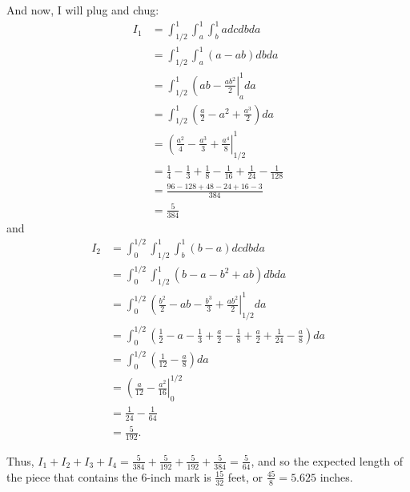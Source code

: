 \documentclass[11pt]{article}
\theoremstyle{definition}
\begin{document}
And now, I will plug and chug:
\begin{align*}
I_1 & = \int_{1/2}^1 \int_a^1 \int_b^1 adcdbda \\
& = \int_{1/2}^1 \int_a^1 (a-ab)dbda \\
& = \int_{1/2}^1 \left(ab - \frac{ab^2}{2}\right|_a^1 da \\
& = \int_{1/2}^1 \left(\frac{a}{2} - a^2 + \frac{a^3}{2}\right)da \\
& = \left(\frac{a^2}{4} - \frac{a^3}{3} + \frac{a^4}{8}\right|_{1/2}^1 \\
& = \frac{1}{4} - \frac{1}{3} +\frac{1}{8} - \frac{1}{16} + \frac{1}{24} - \frac{1}{128} \\
& = \frac{96 - 128 + 48 - 24 + 16 - 3}{384} \\
& = \frac{5}{384}
\end{align*}
and
\begin{align*}
I_2 & = \int_0^{1/2} \int_{1/2}^1 \int_b^1 (b-a)dcdbda \\
& = \int_0^{1/2} \int_{1/2}^1 (b-a-b^2+ab)dbda \\
& = \int_0^{1/2} \left(\frac{b^2}{2} - ab - \frac{b^3}{3} + \frac{ab^2}{2}\right|_{1/2}^1 da \\
& = \int_0^{1/2} \left(\frac{1}{2} - a -\frac{1}{3} + \frac{a}{2} - \frac{1}{8} + \frac{a}{2} + \frac{1}{24} - \frac{a}{8}\right)da \\
& = \int_0^{1/2} \left(\frac{1}{12} - \frac{a}{8}\right)da \\
& = \left(\frac{a}{12} - \frac{a^2}{16}\right|_0^{1/2} \\
& = \frac{1}{24} - \frac{1}{64} \\
& = \frac{5}{192}.
\end{align*}

Thus, $I_1 + I_2 + I_3 + I_4 = \frac{5}{384} + \frac{5}{192} + \frac{5}{192} + \frac{5}{384} = \frac{5}{64}$, and so the expected length of the piece that contains the $6$-inch mark is $\frac{15}{32}$ feet, or $\frac{45}{8} = 5.625$ inches.
\end{document}
